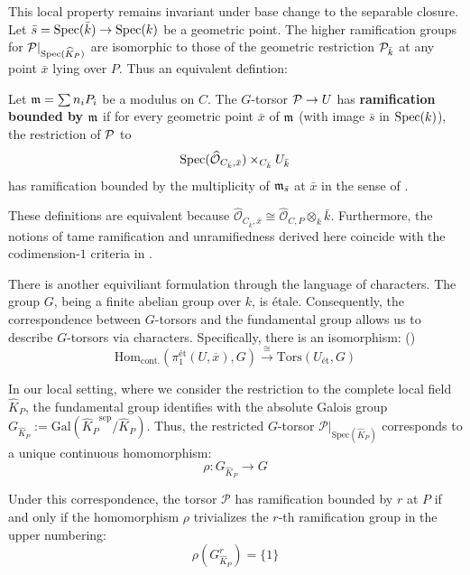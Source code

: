 This local property remains invariant under base change to the separable closure.
Let $\bar{s} = \operatorname{Spec}(\bar{k}) \to \operatorname{Spec}(k)$ 
be a geometric point. 
The higher ramification groups for $\mathcal{P}|_{\operatorname{Spec}(\widehat{K}_P)}$ are isomorphic to those of 
the geometric restriction $\mathcal{P}_{\bar{k}}$ at any point $\bar{x}$ lying over $P$. 
Thus an equivalent defintion:
\begin{definition}
    Let $\mathfrak{m} = \sum n_i P_i$ be a modulus on $C$. 
    The $G$-torsor $\mathcal{P} \to U$ has \textbf{ramification bounded by $\mathfrak{m}$} 
    if for every geometric point $\bar{x}$ of $\mathfrak{m}$ (with image $\bar{s}$ in $\operatorname{Spec}(k)$), 
    the restriction of $\mathcal{P}$ to$$ \operatorname{Spec}(\widehat{\mathcal{O}}_{C_{\bar{k}},\bar{x}}) \times_{C_{\bar{k}}} U_{\bar{k}} $$
    has ramification bounded by the multiplicity of $\mathfrak{m}_{\bar{s}}$ at $\bar{x}$ in the sense of 
    .
\end{definition}
These definitions are equivalent because $\widehat{\mathcal{O}}_{C_{\bar{k}},\bar{x}} \cong \widehat{\mathcal{O}}_{C,P} \otimes_k \bar{k}$. Furthermore, the notions of tame ramification and unramifiedness derived here coincide with the codimension-$1$ criteria in .

There is another equiviliant formulation through the language of characters.
The group $G$, being a finite abelian group over $k$, is \'etale. 
Consequently, the correspondence between $G$-torsors and the fundamental group allows us to describe $G$-torsors
 via characters. Specifically, there is an isomorphism: ()
\[ \mathrm{Hom}_{\mathrm{cont.}}(\pi_1^{\text{\'et}}(U, \overline{x}), G) \xrightarrow{\cong} \mathrm{Tors}(U_{\text{\'et}}, G) \]

In our local setting, where we consider the restriction to the complete local field $\widehat{K}_P$, 
the fundamental group identifies with the absolute Galois group 
$G_{\widehat{K}_P} := \mathrm{Gal}({\widehat{K}_P}^{\mathrm{sep}}/{\widehat{K}_P})$. 
Thus, the restricted $G$-torsor $\mathcal{P}|_{\mathrm{Spec}(\widehat{K}_P)}$ corresponds to a unique continuous homomorphism:
\[ \rho : G_{\widehat{K}_P} \to G \]

Under this correspondence, the torsor $\mathcal{P}$ has ramification bounded by $r$ at $P$ 
if and only if the homomorphism $\rho$ trivializes the $r$-th ramification group in the upper numbering:
\[ \rho(G_{\widehat{K}_P}^r) = \{ 1 \} \]


